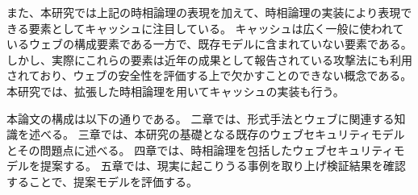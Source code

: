 \documentclass[12pt,a4paper]{jbook}
\begin{document}
また、本研究では上記の時相論理の表現を加えて、時相論理の実装により表現できる要素としてキャッシュに注目している。
キャッシュは広く一般に使われているウェブの構成要素である一方で、既存モデルに含まれていない要素である。
しかし、実際にこれらの要素は近年の成果として報告されている攻撃法\cite{bcpattack}にも利用されており、ウェブの安全性を評価する上で欠かすことのできない概念である。
\color{red}
本研究では、拡張した時相論理を用いてキャッシュの実装も行う。
\color{black}

本論文の構成は以下の通りである。
二章では、形式手法とウェブに関連する知識を述べる。
三章では、本研究の基礎となる既存のウェブセキュリティモデルとその問題点に述べる。
四章では、時相論理を包括したウェブセキュリティモデルを提案する。
五章では、現実に起こりうる事例を取り上げ検証結果を確認することで、提案モデルを評価する。
\end{document}
